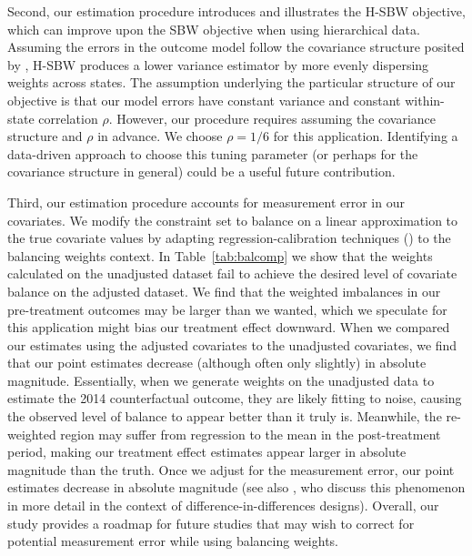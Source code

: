 \documentclass[aoas]{imsart}
\theoremstyle{plain}
\theoremstyle{remark}
\begin{document}
Second, our estimation procedure introduces and illustrates the H-SBW objective, which can improve upon the SBW objective when using hierarchical data. Assuming the errors in the outcome model follow the covariance structure posited by \cite{kloek1981ols}, H-SBW produces a lower variance estimator by more evenly dispersing weights across states. The assumption underlying the particular structure of our objective is that our model errors have constant variance and constant within-state correlation $\rho$. However, our procedure requires assuming the covariance structure and $\rho$ in advance. We choose $\rho = 1/6$ for this application. Identifying a data-driven approach to choose this tuning parameter (or perhaps for the covariance structure in general) could be a useful future contribution. 

Third, our estimation procedure accounts for measurement error in our covariates. We modify the constraint set to balance on a linear approximation to the true covariate values by adapting regression-calibration techniques (\cite{gleser1992importance}) to the balancing weights context. In Table~\ref{tab:balcomp} we show that the weights calculated on the unadjusted dataset fail to achieve the desired level of covariate balance on the adjusted dataset. We find that the weighted imbalances in our pre-treatment outcomes may be larger than we wanted, which we speculate for this application might bias our treatment effect downward. When we compared our estimates using the adjusted covariates to the unadjusted covariates, we find that our point estimates decrease (although often only slightly) in absolute magnitude. Essentially, when we generate weights on the unadjusted data to estimate the 2014 counterfactual outcome, they are likely fitting to noise, causing the observed level of balance to appear better than it truly is. Meanwhile, the re-weighted region may suffer from regression to the mean in the post-treatment period, making our treatment effect estimates appear larger in absolute magnitude than the truth. Once we adjust for the measurement error, our point estimates decrease in absolute magnitude (see also \cite{daw2018matching}, who discuss this phenomenon in more detail in the context of difference-in-differences designs). Overall, our study provides a roadmap for future studies that may wish to correct for potential measurement error while using balancing weights. 
\end{document}
